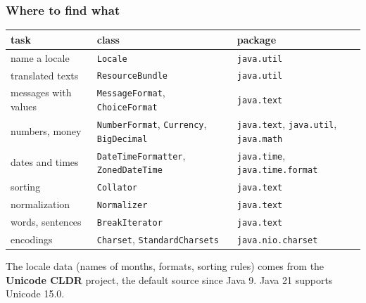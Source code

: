 \documentclass[aspectratio=169,10pt,compress]{beamer}
\begin{document}
\begin{frame}[t,fragile] \frametitle{Where to find what}
  \begin{center}\scriptsize
  \begin{tabular}{L{0.23\textwidth}L{0.33\textwidth}L{0.34\textwidth}}
    \toprule
    \textbf{task} & \textbf{class} & \textbf{package} \\
    \midrule
    name a locale         & \texttt{Locale}                        & \texttt{java.util} \\
    translated texts      & \texttt{ResourceBundle}                & \texttt{java.util} \\
    messages with values  & \texttt{MessageFormat}, \texttt{ChoiceFormat} & \texttt{java.text} \\
    numbers, money        & \texttt{NumberFormat}, \texttt{Currency}, \texttt{BigDecimal} & \texttt{java.text}, \texttt{java.util}, \texttt{java.math} \\
    dates and times       & \texttt{DateTimeFormatter}, \texttt{ZonedDateTime} & \texttt{java.time}, \texttt{java.time.format} \\
    sorting               & \texttt{Collator}                      & \texttt{java.text} \\
    normalization         & \texttt{Normalizer}                    & \texttt{java.text} \\
    words, sentences      & \texttt{BreakIterator}                 & \texttt{java.text} \\
    encodings             & \texttt{Charset}, \texttt{StandardCharsets} & \texttt{java.nio.charset} \\
    \bottomrule
  \end{tabular}
  \end{center}
  \vspace{0.3em}
  \small The locale data (names of months, formats, sorting rules) comes from the
  \textbf{Unicode CLDR} project, the default source since Java 9. Java 21 supports Unicode 15.0.
\end{frame}

\end{document}

